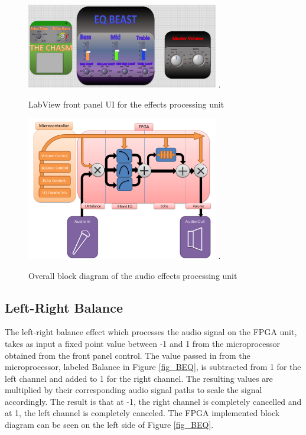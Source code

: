 \begin{figure}[!t]
\centering
\includegraphics[width=3.3in]{frontpanel.png}
\DeclareGraphicsExtensions.
\caption{LabView front panel UI for the effects processing unit}
\label{fig_AEPUfp}
\end{figure}

\begin{figure}[!t]
\centering
\includegraphics[width=3.3in]{aepublock.png}
\DeclareGraphicsExtensions.
\caption{Overall block diagram of the audio effects processing unit}
\label{fig_AEPUBlock}
\end{figure}



\subsection{Left-Right Balance}
The left-right balance effect which processes the audio signal on the FPGA unit, takes as input a fixed point value between -1 and 1 from the microprocessor obtained from the front panel control. 
The value passed in from the microprocessor, labeled Balance in Figure \ref{fig_BEQ}, is subtracted from 1 for the left channel and added to 1 for the right channel. 
The resulting values are multiplied by their corresponding audio signal paths to scale the signal accordingly. The result is that at -1, the right channel is completely cancelled and at 1, the left channel is completely canceled. 
The FPGA implemented block diagram can be seen on the left side of Figure \ref{fig_BEQ}.

